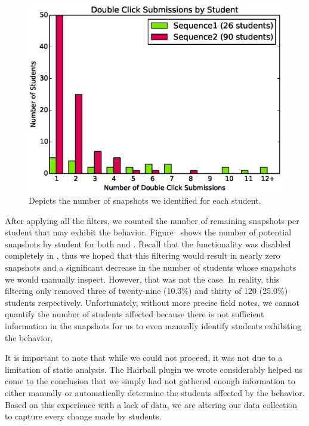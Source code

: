 \begin{figure}[!t]
\centering \includegraphics[width=5.25in]{graphs/dc_submissions.eps}
\caption{Depicts the number of \dce{} snapshots we identified for each
  student.}
\end{figure}

After applying all the filters, we counted the number of remaining snapshots
per student that may exhibit the \dce{}
behavior. Figure~ shows the number of potential
snapshots by student for both \sone{} and \stwo{}. Recall that the \dce{}
functionality was disabled completely in \stwo{}, thus we hoped that this
filtering would result in nearly zero \stwo{} snapshots and a significant
decrease in the number of \sone{} students whose snapshots we would manually
inspect. However, that was not the case. In reality, this filtering only
removed three of twenty-nine (10.3\%) and thirty of 120 (25.0\%) students
respectively. Unfortunately, without more precise field notes, we cannot
quantify the number of students affected because there is not sufficient
information in the snapshots for us to even manually identify students
exhibiting the \dce{} behavior.

It is important to note that while we could not proceed, it was not due to a
limitation of static analysis. The Hairball plugin we wrote considerably helped
us come to the conclusion that we simply had not gathered enough information to
either manually or automatically determine the students affected by the \dce{}
behavior. Based on this experience with a lack of data, we are altering our
data collection to capture every change made by students.
